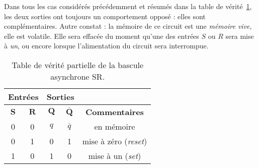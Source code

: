 \documentclass[canadien,12pt,oneside,letterpaper]{article}
\begin{document}
Dans tous les cas considérés précédemment et résumés dans la table de vérité~\ref{table-RS}, les deux sorties ont toujours un comportement opposé : elles sont complémentaires. Autre constat : la mémoire de ce circuit est une \textit{mémoire vive}, elle est volatile. Elle sera effacée du moment qu'une des entrées $S$ ou $R$ sera mise à \textit{un}, ou encore lorsque l'alimentation du circuit sera interrompue.

\begin{table}
\centering
\begin{tabular}{|c|c|c|c|c|}
\cline{1-4}
\multicolumn{2}{|c|}{\textbf{Entrées}} & \multicolumn{2}{|c|}{\textbf{Sorties}} \\
\hline
$\mathbf{S}$ & $\mathbf{R}$ & $\mathbf{Q}$ & $\mathbf{\overline{Q}}$ & \textbf{Commentaires} \\
\hline
0 & 0 & $q$ & $\overline{q}$ & en mémoire \\
\hline
0 & 1 & 0 & 1 & mise à zéro (\textit{reset}) \\
\hline
1 & 0 & 1 & 0 & mise à un (\textit{set}) \\
\hline
\end{tabular}
\caption{\label{table-RS}Table de vérité partielle de la bascule asynchrone SR.}
\end{table}
\end{document}
